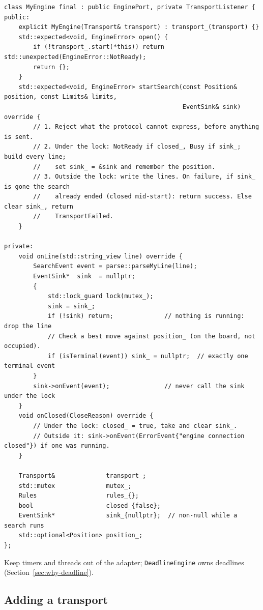 \documentclass[11pt,a4paper]{article}
\newcommand{\code}[1]{\texttt{#1}}
\begin{document}
\begin{lstlisting}
class MyEngine final : public EnginePort, private TransportListener {
public:
    explicit MyEngine(Transport& transport) : transport_(transport) {}
    std::expected<void, EngineError> open() {
        if (!transport_.start(*this)) return std::unexpected(EngineError::NotReady);
        return {};
    }
    std::expected<void, EngineError> startSearch(const Position& position, const Limits& limits,
                                                 EventSink& sink) override {
        // 1. Reject what the protocol cannot express, before anything is sent.
        // 2. Under the lock: NotReady if closed_, Busy if sink_; build every line;
        //    set sink_ = &sink and remember the position.
        // 3. Outside the lock: write the lines. On failure, if sink_ is gone the search
        //    already ended (closed mid-start): return success. Else clear sink_, return
        //    TransportFailed.
    }

private:
    void onLine(std::string_view line) override {
        SearchEvent event = parse::parseMyLine(line);
        EventSink*  sink  = nullptr;
        {
            std::lock_guard lock(mutex_);
            sink = sink_;
            if (!sink) return;              // nothing is running: drop the line
            // Check a best move against position_ (on the board, not occupied).
            if (isTerminal(event)) sink_ = nullptr;  // exactly one terminal event
        }
        sink->onEvent(event);               // never call the sink under the lock
    }
    void onClosed(CloseReason) override {
        // Under the lock: closed_ = true, take and clear sink_.
        // Outside it: sink->onEvent(ErrorEvent{"engine connection closed"}) if one was running.
    }

    Transport&              transport_;
    std::mutex              mutex_;
    Rules                   rules_{};
    bool                    closed_{false};
    EventSink*              sink_{nullptr};  // non-null while a search runs
    std::optional<Position> position_;
};
\end{lstlisting}

\noindent Keep timers and threads out of the adapter; \code{DeadlineEngine} owns deadlines
(Section~\ref{sec:why-deadline}).

\subsection{Adding a transport}
\end{document}
